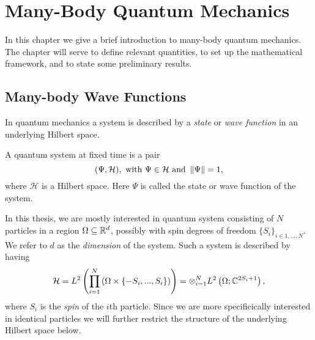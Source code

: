 \chapter{Many-Body Quantum Mechanics}
	In this chapter we give a brief introduction to many-body quantum mechanics. The chapter will serve to define relevant quantities, to set up the mathematical framework, and to state some preliminary results.

\section{Many-body Wave Functions}
	In quantum mechanics a system is described by a \emph{state} or \emph{wave function} in an underlying Hilbert space. 
	\begin{definition}
		A quantum system at fixed time is a pair \begin{equation*}
			(\Psi,\mathcal{H}),\text{ with } \Psi\in\mathcal{H} \text{ and } \left\lVert \Psi \right\rVert=1,
		\end{equation*}
		where $ \mathcal{H} $ is a Hilbert space. Here $ \Psi $ is called the state or wave function of the system.
	\end{definition}
	In this thesis, we are mostly interested in quantum system consisting of $ N $ particles in a region $ \Omega\subseteq \mathbb{R}^d $, possibly with spin degrees of freedom $ \{S_i\}_{i\in{1,\ldots,N}} $. We refer to $ d $ as the \emph{dimension} of the system. Such a system is described by having $$ \mathcal{H}= L^2\left(\prod_{i=1}^{N}\left(\Omega\times \{-S_i,...,S_i\}\right) \right)=\otimes_{i=1}^{N}L^2\left(\Omega;\mathbb{C}^{2S_i+1}\right), $$ where $ S_i $ is the \emph{spin} of the $ i $th particle. Since we are more specificically interested in identical particles we will further restrict the structure of the underlying Hilbert space below.

